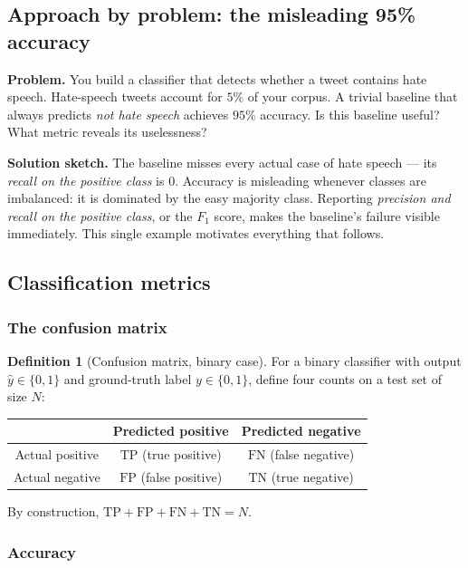 \documentclass[12pt,a4paper]{report}
\theoremstyle{definition}
\newtheorem{definition}{Definition}[section]
\theoremstyle{remark}
\begin{document}
\subsection{Approach by problem: the misleading 95\% accuracy}
\textbf{Problem.} You build a classifier that detects whether a tweet contains hate speech. Hate-speech tweets account for $5\%$ of your corpus. A trivial baseline that always predicts \emph{not hate speech} achieves $95\%$ accuracy. Is this baseline useful? What metric reveals its uselessness?

\textbf{Solution sketch.} The baseline misses every actual case of hate speech --- its \emph{recall on the positive class} is $0$. Accuracy is misleading whenever classes are imbalanced: it is dominated by the easy majority class. Reporting \emph{precision and recall on the positive class}, or the $F_1$ score, makes the baseline's failure visible immediately. This single example motivates everything that follows.

\subsection{Classification metrics}
\label{sec:eval-classification}

\subsubsection*{The confusion matrix}

\begin{definition}[Confusion matrix, binary case]
For a binary classifier with output $\hat{y} \in \{0, 1\}$ and ground-truth label $y \in \{0, 1\}$, define four counts on a test set of size $N$:
\begin{center}
\begin{tabular}{|c|cc|}
\hline
& Predicted positive & Predicted negative \\
\hline
Actual positive & $\mathrm{TP}$ (true positive) & $\mathrm{FN}$ (false negative) \\
Actual negative & $\mathrm{FP}$ (false positive) & $\mathrm{TN}$ (true negative) \\
\hline
\end{tabular}
\end{center}
By construction, $\mathrm{TP} + \mathrm{FP} + \mathrm{FN} + \mathrm{TN} = N$.
\end{definition}

\subsubsection*{Accuracy}
\end{document}
